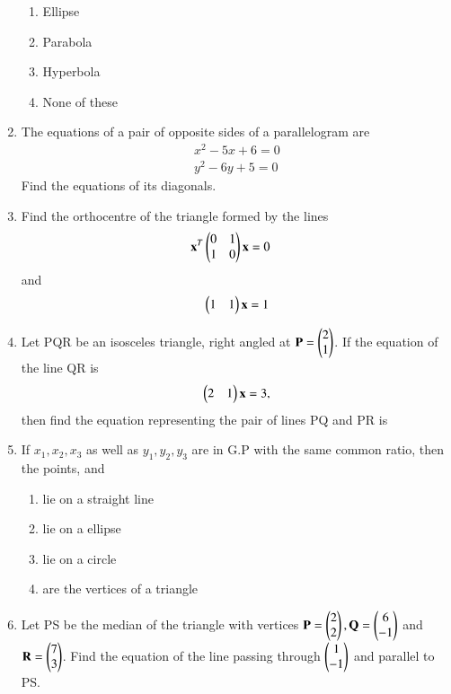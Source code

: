 \begin{enumerate}[label=\arabic*.,ref=\thesubsection.\theenumi]
    \begin{enumerate}
     \item  Ellipse
     \item  Parabola
     \item  Hyperbola
     \item  None of these
    \end{enumerate}
    \item The equations of a pair of opposite sides of a parallelogram are  
\begin{align} 
x^2-5x+6 = 0
\\
y^2-6y+5 = 0
\end{align}
Find  the equations of its diagonals. 
    \item Find the orthocentre of the triangle formed by the lines 
\begin{align}
    \mathbf {x}^T\begin{pmatrix}0 & 1 \\ 1 & 0\end{pmatrix} \mathbf{x} &=0
    \end{align} 
and 
\begin{align}
\begin{pmatrix}1 & 1\end{pmatrix} \mathbf x =1
    \end{align} 
    \item Let PQR be an isosceles triangle, right angled at  $\mathbf{P}=\begin{pmatrix}2\\1\end{pmatrix}$. If the equation of the line QR is \begin{align}\begin{pmatrix}2 & 1\end{pmatrix}\mathbf{x} = 3, \end{align} then find the equation representing the pair of lines PQ and PR is
    \item If $x_1,x_2,x_3$ as well as $y_1,y_2,y_3$ are in G.P with the same common ratio, then the points, and 
    \begin{enumerate}
     \item  lie on a straight line
     \item  lie on a ellipse
    \item  lie on a circle
    \item  are the vertices of a triangle
    \end{enumerate}
    \item Let PS be the median of the triangle with vertices $\mathbf{P}=\begin{pmatrix}2\\2\end{pmatrix}, \mathbf{Q}=\begin{pmatrix}6\\-1\end{pmatrix}$ and $\mathbf{R}=\begin{pmatrix}7\\3\end{pmatrix}$. Find the equation of the line passing through $\begin{pmatrix}1\\-1\end{pmatrix}$ and parallel to PS.

\end{enumerate}
